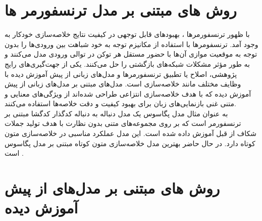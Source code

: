 \section{روش ‌های مبتنی بر مدل ترنسفورمر ها}
با ظهور ترنسفورمرها \cite{vaswani2017attention}، بهبودهای قابل توجهی در کیفیت نتایج خلاصه‌سازی خودکار به وجود آمد. ترنسفومرها با استفاده از مکانیزم توجه به خود‏
شباهت بین ورودی‌ها را بدون توجه به موقعیت موازی آن‌ها با حضور مستقل هر توکن در توالی ورودی مدل می‌کنند و به طور مؤثر مشکلات شبکه‌های بازگشتی را حل می‌کنند. یکی از جهت‌گیری‌های رایج پژوهشی، اصلاح یا تطبیق ترنسفورمرها و مدل‌های زبانی از پیش آموزش دیده با وظایف مختلف مانند خلاصه‌سازی است. مدل‌های مبتنی بر مدل‌های زبانی از پیش آموزش دیده که با هدف خلاصه‌سازی انتزاعی طراحی شده‌اند از ویژگی‌های معنایی و متنی غنی بازنمایی‌های زبان برای بهبود کیفیت و دقت خلاصه‌‌ها استفاده می‌کنند.
\\
به عنوان مثال مدل پگاسوس
\cite{zhang2020pegasus}
یک مدل دنباله به دنباله کدگذار کدگشا مبتنی بر ترنسفورمر است که بر روی مجموعه‌های متنی بدون نظارت با هدف تولید جملات شکاف
از قبل آموزش داده شده است. این مدل عملکرد مناسبی در خلاصه‌سازی متون کوتاه دارد. در حال حاضر بهترین مدل خلاصه‌سازی متون کوتاه مبتنی بر مدل پگاسوس است
\cite{sherborne2023meta}.

\section{روش های مبتنی بر مدل‌های از پیش آموزش دیده}




